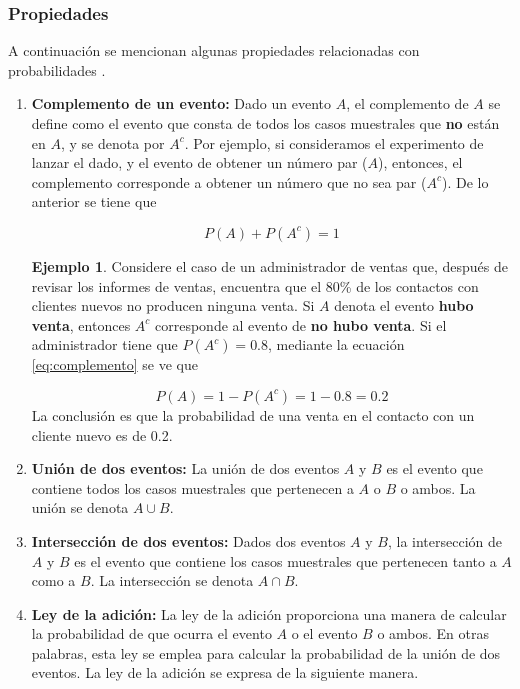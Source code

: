 \documentclass[
]{book}
\theoremstyle{definition}
\theoremstyle{definition}
\newtheorem{example}{Ejemplo}[chapter]
\theoremstyle{definition}
\theoremstyle{definition}
\theoremstyle{remark}
\begin{document}
\hypertarget{propiedades}{%
\subsubsection*{Propiedades}\label{propiedades}}

A continuación se mencionan algunas propiedades relacionadas con probabilidades \citep[página 157]{anderson}.

\begin{enumerate}
\def\labelenumi{\arabic{enumi}.}
\item
  \textbf{Complemento de un evento:} Dado un evento \(A\), el complemento de \(A\) se define como el evento que consta de todos los casos muestrales que \textbf{no} están en \(A\), y se denota por \(A^c\). Por ejemplo, si consideramos el experimento de lanzar el dado, y el evento de obtener un número par (\(A\)), entonces, el complemento corresponde a obtener un número que no sea par (\(A^c\)). De lo anterior se tiene que

  \begin{equation}
  P(A) + P(A^c) = 1
  \label{eq:complemento}
  \end{equation}

  \begin{example}
  Considere el caso de un administrador de ventas que, después de revisar los informes de ventas, encuentra que el 80\% de los contactos con clientes nuevos no producen ninguna venta. Si \(A\) denota el evento \textbf{hubo venta}, entonces \(A^c\) corresponde al evento de \textbf{no hubo venta}. Si el administrador tiene que \(P(A^c) = 0.8\), mediante la ecuación \eqref{eq:complemento} se ve que

  \[P(A) = 1 - P(A^c) = 1 - 0.8 = 0.2\]
  La conclusión es que la probabilidad de una venta en el contacto con un cliente nuevo es de 0.2.
  \end{example}
\item
  \textbf{Unión de dos eventos:} La unión de dos eventos \(A\) y \(B\) es el evento que contiene todos los casos muestrales que pertenecen a \(A\) o \(B\) o ambos. La unión se denota \(A \cup B\).
\item
  \textbf{Intersección de dos eventos:} Dados dos eventos \(A\) y \(B\), la intersección de \(A\) y \(B\) es el evento que contiene los casos muestrales que pertenecen tanto a \(A\) como a \(B\). La intersección se denota \(A \cap B\).
\item
  \textbf{Ley de la adición:} La ley de la adición proporciona una manera de calcular la probabilidad de que ocurra el evento \(A\) o el evento \(B\) o ambos. En otras palabras, esta ley se emplea para calcular la probabilidad de la unión de dos eventos. La ley de la adición se expresa de la siguiente manera.


\end{enumerate}
\end{document}
